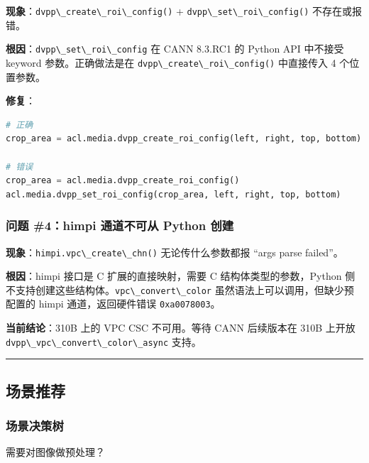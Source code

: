 \textbf{现象}：\passthrough{\lstinline!dvpp\_create\_roi\_config()!} +
\passthrough{\lstinline!dvpp\_set\_roi\_config()!} 不存在或报错。

\textbf{根因}：\passthrough{\lstinline!dvpp\_set\_roi\_config!} 在 CANN
8.3.RC1 的 Python API 中不接受 keyword 参数。正确做法是在
\passthrough{\lstinline!dvpp\_create\_roi\_config()!} 中直接传入 4
个位置参数。

\textbf{修复}：

\begin{lstlisting}[language=Python]
# 正确
crop_area = acl.media.dvpp_create_roi_config(left, right, top, bottom)

# 错误
crop_area = acl.media.dvpp_create_roi_config()
acl.media.dvpp_set_roi_config(crop_area, left, right, top, bottom)
\end{lstlisting}

\subsubsection{问题 \#4：himpi 通道不可从 Python
创建}\label{src-book-chapter6-h108}

\textbf{现象}：\passthrough{\lstinline!himpi.vpc\_create\_chn()!}
无论传什么参数都报 ``args parse failed''。

\textbf{根因}：himpi 接口是 C 扩展的直接映射，需要 C
结构体类型的参数，Python
侧不支持创建这些结构体。\passthrough{\lstinline!vpc\_convert\_color!}
虽然语法上可以调用，但缺少预配置的 himpi 通道，返回硬件错误
\passthrough{\lstinline!0xa0078003!}。

\textbf{当前结论}：310B 上的 VPC CSC 不可用。等待 CANN 后续版本在 310B
上开放 \passthrough{\lstinline!dvpp\_vpc\_convert\_color\_async!} 支持。

\begin{center}\rule{0.5\linewidth}{0.5pt}\end{center}

\subsection{场景推荐}\label{src-book-chapter6-h109}

\subsubsection{场景决策树}\label{src-book-chapter6-h110}

需要对图像做预处理？

